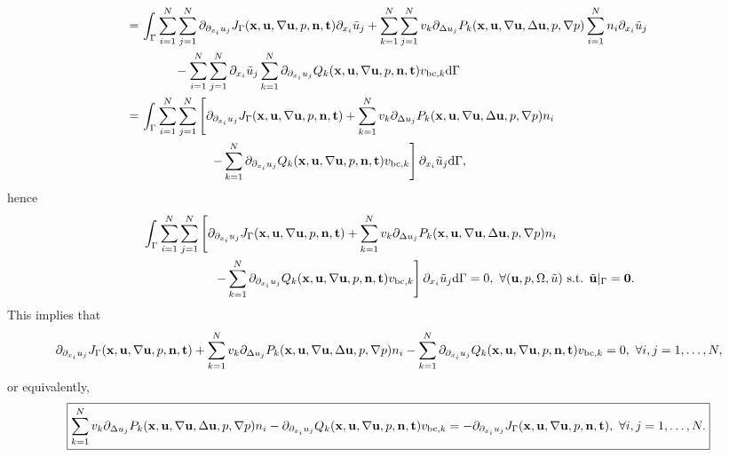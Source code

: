 \documentclass[oneside,11pt]{book}
\numberwithin{equation}{section}
\begin{document}
\begin{itemize}[leftmargin=0in]
\begin{itemize}
\begin{align*}
            =&\, \int_\Gamma \sum_{i=1}^N\sum_{j=1}^N \partial_{\partial_{x_i}u_j}J_\Gamma({\bf x},{\bf u},\nabla{\bf u},p,{\bf n},{\bf t})\partial_{x_i}\tilde{u}_j + \sum_{k=1}^N\sum_{j=1}^N v_k\partial_{\Delta u_j}P_k({\bf x},{\bf u},\nabla{\bf u},\Delta{\bf u},p,\nabla p)\sum_{i=1}^N n_i\partial_{x_i}\tilde{u}_j\\
            &\hspace{1cm}- \sum_{i=1}^N\sum_{j=1}^N \partial_{x_i}\tilde{u}_j\sum_{k=1}^N\partial_{\partial_{x_i}u_j}Q_k({\bf x},{\bf u},\nabla{\bf u},p,{\bf n},{\bf t})v_{{\rm bc},k}{\rm d}\Gamma\\
            =&\, \int_\Gamma \sum_{i=1}^N\sum_{j=1}^N \left[\partial_{\partial_{x_i}u_j}J_\Gamma({\bf x},{\bf u},\nabla{\bf u},p,{\bf n},{\bf t}) + \sum_{k=1}^N v_k\partial_{\Delta u_j}P_k({\bf x},{\bf u},\nabla{\bf u},\Delta{\bf u},p,\nabla p)n_i\right.\\
            &\hspace{2cm}\left. - \sum_{k=1}^N \partial_{\partial_{x_i}u_j}Q_k({\bf x},{\bf u},\nabla{\bf u},p,{\bf n},{\bf t})v_{{\rm bc},k}\right]\partial_{x_i}\tilde{u}_j{\rm d}\Gamma,
        \end{align*}
        hence
        \begin{align*}
            &\int_\Gamma \sum_{i=1}^N\sum_{j=1}^N \left[\partial_{\partial_{x_i}u_j}J_\Gamma({\bf x},{\bf u},\nabla{\bf u},p,{\bf n},{\bf t}) + \sum_{k=1}^N v_k\partial_{\Delta u_j}P_k({\bf x},{\bf u},\nabla{\bf u},\Delta{\bf u},p,\nabla p)n_i\right.\\
            &\hspace{2cm}\left. - \sum_{k=1}^N \partial_{\partial_{x_i}u_j}Q_k({\bf x},{\bf u},\nabla{\bf u},p,{\bf n},{\bf t})v_{{\rm bc},k}\right]\partial_{x_i}\tilde{u}_j{\rm d}\Gamma = 0,\ \forall({\bf u},p,\Omega,\tilde{u}) \mbox{ s.t. } \tilde{\bf u}|_\Gamma = {\bf 0}.
        \end{align*}
        This implies that
        \begin{align*}
            \partial_{\partial_{x_i}u_j}J_\Gamma({\bf x},{\bf u},\nabla{\bf u},p,{\bf n},{\bf t}) + \sum_{k=1}^N v_k\partial_{\Delta u_j}P_k({\bf x},{\bf u},\nabla{\bf u},\Delta{\bf u},p,\nabla p)n_i - \sum_{k=1}^N \partial_{\partial_{x_i}u_j}Q_k({\bf x},{\bf u},\nabla{\bf u},p,{\bf n},{\bf t})v_{{\rm bc},k} = 0,\ \forall i,j = 1,\ldots,N,
        \end{align*}
        or equivalently,
        \begin{align*}
            \boxed{\sum_{k=1}^N v_k\partial_{\Delta u_j}P_k({\bf x},{\bf u},\nabla{\bf u},\Delta{\bf u},p,\nabla p)n_i - \partial_{\partial_{x_i}u_j}Q_k({\bf x},{\bf u},\nabla{\bf u},p,{\bf n},{\bf t})v_{{\rm bc},k} = -\partial_{\partial_{x_i}u_j}J_\Gamma({\bf x},{\bf u},\nabla{\bf u},p,{\bf n},{\bf t}),\ \forall i,j = 1,\ldots,N.}

\end{align*}
\end{itemize}
\end{itemize}
\end{document}
